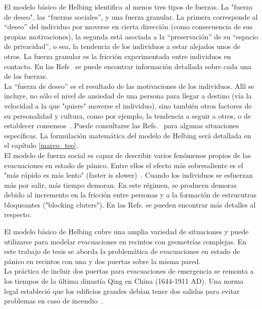 \noindent El modelo básico de Helbing identifica al menos tres tipos de fuerzas. La "fuerza de deseo", las “fuerzas sociales”,  y una fuerza granular.  La primera corresponde al “deseo” del individuo por moverse en cierta dirección (como consecuencia de sus propias motivaciones), la segunda está asociada a la “preservación” de su “espacio de privacidad”, o sea, la tendencia de los individuos a estar alejados unos de otros. La fuerza granular es la  fricción experimentada entre individuos en contacto. En las Refs~\cite{Helbing1,Dorso1,Dorso3} se puede encontrar información detallada sobre cada una de las fuerzas.\\ 

\noindent La “fuerza de deseo” es el resultado de las motivaciones de los individuos. Allí se incluye, no sólo el nivel de ansiedad de una persona para llegar a destino (vía la velocidad a la que "quiere" moverse el individuo), sino también otros factores de su personalidad y cultura, como por ejemplo, la tendencia a seguir a otros, o de establecer consensos~\cite{Dorso3,Dorso4}.  Puede consultarse las Refs.~\cite{Wang,low} para algunas situaciones específicas. 
La formulación matemática del modelo de Helbing será detallada en el capítulo \ref{marco_teo}. \\ 

El modelo de fuerza social es capaz de describir varios fenómenos propios de las evacuaciones en estado de pánico. Entre ellos el efecto más sobresaliente es el "más rápido es más lento" (faster is slower)~\cite{Helbing1}. Cuando los individuos se esfuerzan más por salir, más tiempo demoran. En este régimen, se producen demoras debido al incremento en la fricción entre personas y a la formación de estrucutras bloqueantes ("blocking cluters"). En las Refs. \cite{Dorso1} se pueden encontrar más detalles al respecto.

\noindent El modelo básico de Helbing cubre una amplia variedad de situaciones y puede utilizarse para modelar evacuaciones en recintos con geometrías complejas. En este trabajo de tesis se aborda la problemática de evacuaciones en estado de pánico en recintos con una y dos puertas sobre la misma pared.\\ 

\noindent La práctica de incluir dos puertas para evacuaciones de emergencia se remonta a los tiempos de la última dinastía Qing en China (1644-1911 AD). Una norma legal estableció que los edificios grandes debían tener dos salidas para evitar problemas en caso de incendio~\cite{cheng}.\\

